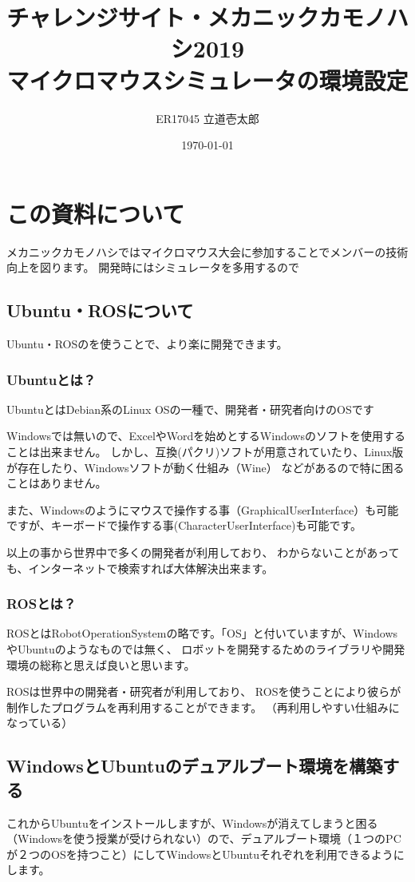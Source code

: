 \documentclass[11pt,a4paper]{jsarticle}
\title{チャレンジサイト・メカニックカモノハシ2019\\マイクロマウスシミュレータの環境設定}
\author{ER17045 立道壱太郎}
\date{\today}
\begin{document}
\maketitle
%
%
\section{この資料について}
メカニックカモノハシではマイクロマウス大会に参加することでメンバーの技術向上を図ります。
開発時にはシミュレータを多用するので


\subsection{Ubuntu・ROSについて}
Ubuntu・ROSのを使うことで、より楽に開発できます。
\subsubsection{Ubuntuとは？}
UbuntuとはDebian系のLinux OSの一種で、開発者・研究者向けのOSです

Windowsでは無いので、ExcelやWordを始めとするWindowsのソフトを使用することは出来ません。
しかし、互換(パクリ)ソフトが用意されていたり、Linux版が存在したり、Windowsソフトが動く仕組み（Wine）
などがあるので特に困ることはありません。

また、Windowsのようにマウスで操作する事（GraphicalUserInterface）も可能ですが、キーボードで操作する事(CharacterUserInterface)も可能です。

以上の事から世界中で多くの開発者が利用しており、
わからないことがあっても、インターネットで検索すれば大体解決出来ます。


\subsubsection{ROSとは？}
ROSとはRobotOperationSystemの略です。「OS」と付いていますが、WindowsやUbuntuのようなものでは無く、
ロボットを開発するためのライブラリや開発環境の総称と思えば良いと思います。

ROSは世界中の開発者・研究者が利用しており、
ROSを使うことにより彼らが制作したプログラムを再利用することができます。
（再利用しやすい仕組みになっている）



\newpage
\subsection{WindowsとUbuntuのデュアルブート環境を構築する}
これからUbuntuをインストールしますが、Windowsが消えてしまうと困る（Windowsを使う授業が受けられない）ので、デュアルブート環境（１つのPCが２つのOSを持つこと）にしてWindowsとUbuntuそれぞれを利用できるようにします。
\end{document}
